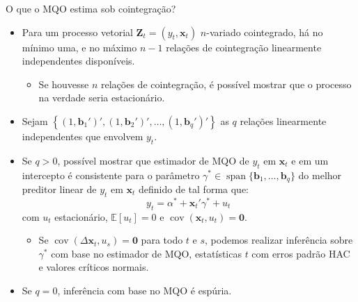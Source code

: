 \documentclass[11pt]{beamer}
\begin{document}
\begin{frame}{O que o MQO estima sob cointegração?}
\begin{itemize}
	\item Para um processo vetorial $\boldsymbol{Z}_t = (y_t,\boldsymbol{x}_t)$ $n$-variado cointegrado, há no mínimo uma, e no máximo $n-1$ relações de cointegração linearmente independentes disponíveis.
	\begin{itemize}
		\item Se houvesse $n$ relações de cointegração, é possível mostrar que o processo na verdade seria estacionário.
	\end{itemize}
	\item Sejam $\left\{(1,
		\boldsymbol{b}_1'
	)', 
(1,
\boldsymbol{b}_2'
)',\ldots, (1,
\boldsymbol{b}_q'
)'\right\}$ as $q$ relações linearmente independentes que envolvem $y_t$.
		\item Se $q > 0$, possível mostrar que estimador de MQO de $y_t$ em  $\boldsymbol{x}_t$ e em um intercepto é consistente para o parâmetro $\gamma^* \in \operatorname{span} \{\boldsymbol{b}_1,\ldots, \boldsymbol{b}_q\}$ do {\color{blue}melhor preditor linear de $y_t$ em $\boldsymbol{x}_t$} definido de tal forma que:
		$$y_t = \alpha^* + \boldsymbol{x}_t '\gamma^* + u_t\, $$
		com $u_t$ estacionário, $\mathbb{E}[u_t] = 0$ e $\operatorname{cov}(\boldsymbol{x}_t,u_t) = \boldsymbol{0}$.
		\begin{itemize}
			\item Se $\operatorname{cov}(\Delta \boldsymbol{x}_t , u_s) = \boldsymbol{0}$ para todo $t$ e $s$, podemos realizar inferência sobre  $\gamma^*$ com base no estimador de MQO, estatísticas $t$ com erros padrão HAC e valores críticos normais.
		\end{itemize}
		\item Se $q=0$, inferência com base no MQO é espúria.
\end{itemize}
\end{frame}
\end{document}
